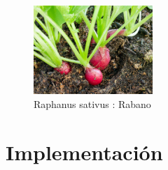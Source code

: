 \documentclass[conference]{IEEEtran}
\begin{document}
	\begin{figure}[h]
		\centering
		\includegraphics[width=0.4\textwidth]{media/raphanos.jpg}
		\caption{Raphanus sativus : Rabano}
		\label{fig:raphanus-sativus}
	\end{figure}
	
	
	\section{Implementación}
	
	
	
\end{document}
